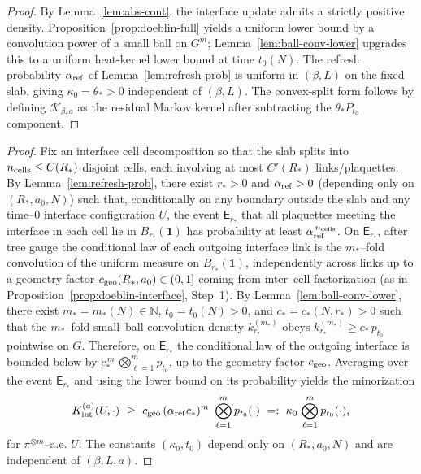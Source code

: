 \documentclass[11pt]{amsart}
\theoremstyle{plain}
\theoremstyle{definition}
\theoremstyle{remark}
\begin{document}
\begin{proof}
By Lemma~\ref{lem:abs-cont}, the interface update admits a strictly positive density. Proposition~\ref{prop:doeblin-full} yields a uniform lower bound by a convolution power of a small ball on $G^m$; Lemma~\ref{lem:ball-conv-lower} upgrades this to a uniform heat-kernel lower bound at time $t_0(N)$. The refresh probability $\alpha_{\rm ref}$ of Lemma~\ref{lem:refresh-prob} is uniform in $(\beta,L)$ on the fixed slab, giving $\kappa_0=\theta_*>0$ independent of $(\beta,L)$. The convex-split form follows by defining $\mathcal K_{\beta,a}$ as the residual Markov kernel after subtracting the $\theta_* P_{t_0}$ component.
\end{proof}

\begin{proof}
Fix an interface cell decomposition so that the slab splits into $n_{\rm cells}\le C(R_*)$ disjoint cells, each involving at most $C'(R_*)$ links/plaquettes. By Lemma~\ref{lem:refresh-prob}, there exist $r_*>0$ and $\alpha_{\rm ref}>0$ (depending only on $(R_*,a_0,N)$) such that, conditionally on any boundary outside the slab and any time–$0$ interface configuration $U$, the event $\mathsf E_{r_*}$ that all plaquettes meeting the interface in each cell lie in $B_{r_*}(\mathbf 1)$ has probability at least $\alpha_{\rm ref}^{\,n_{\rm cells}}$. On $\mathsf E_{r_*}$, after tree gauge the conditional law of each outgoing interface link is the $m_*$–fold convolution of the uniform measure on $B_{r_*}(\mathbf 1)$, independently across links up to a geometry factor $c_{\rm geo}(R_*,a_0)\in(0,1]$ coming from inter–cell factorization (as in Proposition~\ref{prop:doeblin-interface}, Step~1). By Lemma~\ref{lem:ball-conv-lower}, there exist $m_*=m_*(N)\in\mathbb N$, $t_0=t_0(N)>0$, and $c_*=c_*(N,r_*)>0$ such that the $m_*$–fold small–ball convolution density $k_{r_*}^{(m_*)}$ obeys $k_{r_*}^{(m_*)}\ge c_*\,p_{t_0}$ pointwise on $G$. Therefore, on $\mathsf E_{r_*}$ the conditional law of the outgoing interface is bounded below by $c_*^{\,m}\,\bigotimes_{\ell=1}^m p_{t_0}$, up to the geometry factor $c_{\rm geo}$. Averaging over the event $\mathsf E_{r_*}$ and using the lower bound on its probability yields the minorization
\[
  K_{\rm int}^{(a)}(U,\cdot)\ \ge\ c_{\rm geo}\, (\alpha_{\rm ref} c_*)^{m}\ \bigotimes_{\ell=1}^m p_{t_0}(\cdot)\ =:\ \kappa_0\, \bigotimes_{\ell=1}^m p_{t_0}(\cdot),
\]
for $\pi^{\otimes m}$–a.e. $U$. The constants $(\kappa_0,t_0)$ depend only on $(R_*,a_0,N)$ and are independent of $(\beta,L,a)$.
\end{proof}
\end{document}
